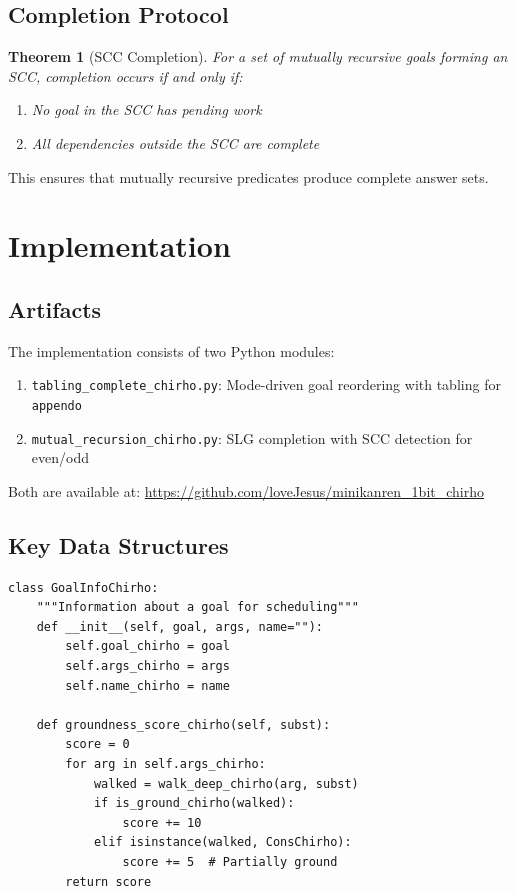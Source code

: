 \documentclass[11pt,a4paper]{article}
\newtheorem{theorem}{Theorem}
\begin{document}
\subsection{Completion Protocol}
\label{subsec:completion_chirho}

\begin{theorem}[SCC Completion]
\label{thm:scc_completion_chirho}
For a set of mutually recursive goals forming an SCC, completion occurs
if and only if:
\begin{enumerate}
  \item No goal in the SCC has pending work
  \item All dependencies outside the SCC are complete
\end{enumerate}
\end{theorem}

This ensures that mutually recursive predicates produce complete answer sets.

\section{Implementation}
\label{sec:implementation_chirho}

\subsection{Artifacts}
\label{subsec:artifacts_chirho}

The implementation consists of two Python modules:

\begin{enumerate}
  \item \texttt{tabling\_complete\_chirho.py}: Mode-driven goal reordering with
        tabling for \texttt{appendo}
  \item \texttt{mutual\_recursion\_chirho.py}: SLG completion with SCC detection
        for even/odd
\end{enumerate}

Both are available at:
\url{https://github.com/loveJesus/minikanren_1bit_chirho}

\subsection{Key Data Structures}
\label{subsec:datastructures_chirho}

\begin{lstlisting}[caption={Goal information for scheduling}]
class GoalInfoChirho:
    """Information about a goal for scheduling"""
    def __init__(self, goal, args, name=""):
        self.goal_chirho = goal
        self.args_chirho = args
        self.name_chirho = name

    def groundness_score_chirho(self, subst):
        score = 0
        for arg in self.args_chirho:
            walked = walk_deep_chirho(arg, subst)
            if is_ground_chirho(walked):
                score += 10
            elif isinstance(walked, ConsChirho):
                score += 5  # Partially ground
        return score
\end{lstlisting}
\end{document}
